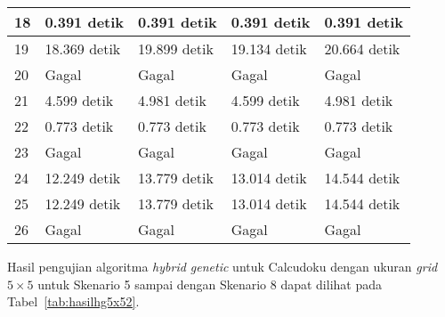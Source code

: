 \begin{table}
\begin{tabular}{| l | l | l | l | l |}
\hline
18 & 0.391 detik & 0.391 detik & 0.391 detik & 0.391 detik \\
\hline
19 & 18.369 detik & 19.899 detik & 19.134 detik & 20.664 detik \\
\hline
20 & Gagal & Gagal & Gagal & Gagal \\
\hline
21 & 4.599 detik & 4.981 detik & 4.599 detik & 4.981 detik \\
\hline
22 & 0.773 detik & 0.773 detik & 0.773 detik & 0.773 detik \\
\hline
23 & Gagal & Gagal & Gagal & Gagal \\
\hline
24 & 12.249 detik & 13.779 detik & 13.014 detik & 14.544 detik \\
\hline
25 & 12.249 detik & 13.779 detik & 13.014 detik & 14.544 detik \\
\hline
26 & Gagal & Gagal & Gagal & Gagal \\
\hline
\end{tabular}
\label{tab:hasilhg5x51}
\end{table}

Hasil pengujian algoritma \textit{hybrid genetic} untuk Calcudoku dengan ukuran \textit{grid} \begin{math}5 \times 5\end{math} untuk Skenario 5 sampai dengan Skenario 8 dapat dilihat pada Tabel~\ref{tab:hasilhg5x52}.

